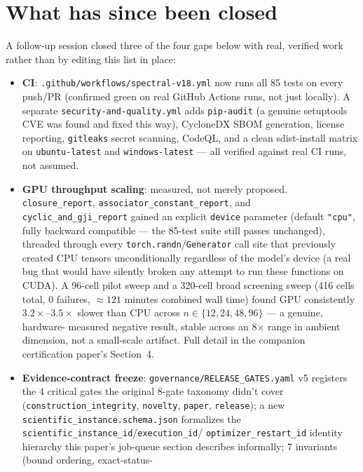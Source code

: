 \documentclass[11pt]{amsart}
\begin{document}
\section{What has since been closed}
\label{sec:closed}
A follow-up session closed three of the four gaps below with real,
verified work rather than by editing this list in place:
\begin{itemize}[leftmargin=*]
\item \textbf{CI}: \texttt{.github/workflows/spectral-v18.yml} now runs
  all 85 tests on every push/PR (confirmed green on real GitHub Actions
  runs, not just locally). A separate
  \texttt{security-and-quality.yml} adds \texttt{pip-audit} (a genuine
  setuptools CVE was found and fixed this way), CycloneDX SBOM
  generation, license reporting, \texttt{gitleaks} secret scanning,
  CodeQL, and a clean sdist-install matrix on \texttt{ubuntu-latest} and
  \texttt{windows-latest} --- all verified against real CI runs, not
  assumed.
\item \textbf{GPU throughput scaling}: measured, not merely proposed.
  \texttt{closure\_report}, \texttt{associator\_constant\_report}, and
  \texttt{cyclic\_and\_gji\_report} gained an explicit \texttt{device}
  parameter (default \texttt{"cpu"}, fully backward compatible --- the
  85-test suite still passes unchanged), threaded through every
  \texttt{torch.randn}/\texttt{Generator} call site that previously
  created CPU tensors unconditionally regardless of the model's device
  (a real bug that would have silently broken any attempt to run these
  functions on CUDA). A 96-cell pilot sweep and a 320-cell broad
  screening sweep (416 cells total, 0 failures, $\approx 121$ minutes
  combined wall time) found GPU consistently $3.2\times$--$3.5\times$
  slower than CPU across $n\in\{12,24,48,96\}$ --- a genuine, hardware-
  measured negative result, stable across an 8$\times$ range in ambient
  dimension, not a small-scale artifact. Full detail in the companion
  certification paper's Section~4.
\item \textbf{Evidence-contract freeze}: \texttt{governance/RELEASE\_GATES.yaml}
  v5 registers the 4 critical gates the original 8-gate taxonomy didn't
  cover (\texttt{construction\_integrity}, \texttt{novelty}, \texttt{paper},
  \texttt{release}); a new \texttt{scientific\_instance.schema.json}
  formalizes the \texttt{scientific\_instance\_id}/\texttt{execution\_id}/
  \texttt{optimizer\_restart\_id} identity hierarchy this paper's job-queue
  section describes informally; 7 invariants (bound ordering, exact-status-

\end{itemize}
\end{document}

